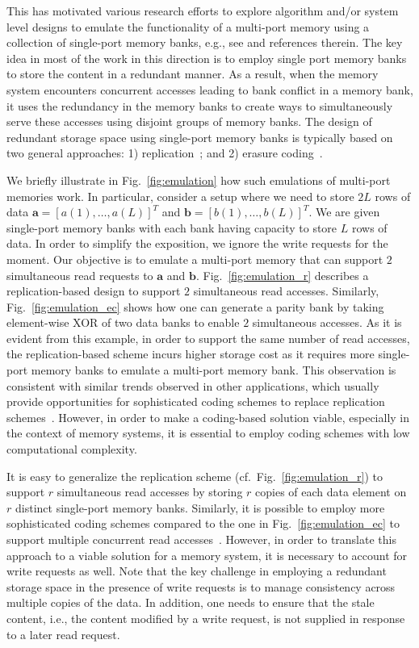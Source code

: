 This has motivated various research efforts to explore algorithm and/or system level designs to emulate the functionality of a multi-port memory using a collection of single-port memory banks, e.g., see \cite{ACP88, EMY91, RG91,CCES93, Memoir_xor, Memoir_xor_virtual} and references therein. The key idea in most of the work in this direction is to employ single port memory banks to store the content in a redundant manner. As a result, when the memory system encounters concurrent accesses leading to bank conflict in a memory bank, it uses the redundancy in the memory banks to create ways to simultaneously serve these accesses using disjoint groups of memory banks. The design of redundant storage space using single-port memory banks is typically based on two general approaches: 1) replication~\cite{ACP88}; and 2) erasure coding~\cite{RG91, Memoir_xor, Memoir_xor_virtual}. 

We briefly illustrate in Fig.~\ref{fig:emulation} how such emulations of multi-port memories work. In particular, consider a setup where we need to store $2L$ rows of data $\mathbf{a} = [a(1),\ldots, a(L)]^T$ and $\mathbf{b} = [b(1),\ldots, b(L)]^T$. We are given single-port memory banks with each bank having capacity to store $L$ rows of data. In order to simplify the exposition, we ignore the write requests for the moment. Our objective is to emulate a multi-port memory that can support $2$ simultaneous read requests to $\mathbf{a}$ and $\mathbf{b}$. Fig.~\ref{fig:emulation_r} describes a replication-based design to support $2$ simultaneous read accesses. Similarly, Fig.~\ref{fig:emulation_ec} shows how one can generate a parity bank by taking element-wise XOR of two data banks to enable $2$ simultaneous accesses. As it is evident from this example, in order to support the same number of read accesses, the replication-based scheme incurs higher storage cost as it requires more single-port memory banks to emulate a multi-port memory bank. This observation is consistent with similar trends observed in other applications, which usually provide opportunities for sophisticated coding schemes to replace replication schemes~\cite{MacSlo, Weatherspoon:2002}. However, in order to make a coding-based solution viable, especially in the context of memory systems, it is essential to employ coding schemes with low computational complexity.

It is easy to generalize the replication scheme (cf.~Fig.~\ref{fig:emulation_r}) to support $r$ simultaneous read accesses by storing $r$ copies of each data element on $r$ distinct single-port memory banks. Similarly, it is possible to employ more sophisticated coding schemes compared to the one in Fig.~\ref{fig:emulation_ec} to support multiple concurrent read accesses~\cite{batchcodes, RSDG16, WKCB17}. However, in order to translate this approach to a viable solution for a memory system, it is necessary to account for write requests as well. Note that the key challenge in employing a redundant storage space in the presence of write requests is to manage consistency across multiple copies of the data. In addition, one needs to ensure that the stale content, i.e., the content modified by a write request, is not supplied in response to a later read request. 

